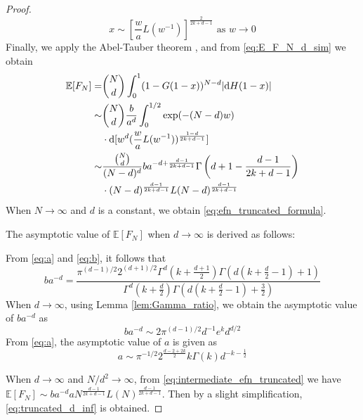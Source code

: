 \documentclass[conference,a4paper]{IEEEtran}
\def\E{\mathbb{E}}
\def\dd{\mathrm{d}}
\begin{document}
\begin{proof}
\begin{equation*}
     x \sim [\frac{w}{a} L(w^{-1})]^{\frac{2}{2k+d-1}} \textrm{ as } w \to 0
\end{equation*}
Finally, 
we apply the Abel-Tauber theorem
\cite{omey1989abelian}, and from \eqref{eq:E_F_N_d_sim} we obtain
\begin{align}
    \E[F_N] =& \binom{N}{d}\int_0^1 (1 - G(1-x))^{N-d} |\dd H(1-x)| 
    \notag \\
     \sim &\binom{N}{d} \frac{b}{a^d} \int_0^{1/2} \exp(-(N-d)w)\\
     & \cdot \dd [w^d (\frac{w}{a} L(w^{-1}))^{\frac{1-d}{2k+d-1}} ]
    \notag \\
    \sim &\frac{\binom{N}{d}}{(N-d)^d} ba^{-d+\frac{d-1}{2k+d-1}}
    \Gamma 
    \left(d+1-\frac{d-1}{2k+d-1}\right)\\
    &\cdot(N-d)^{\frac{d-1}{2k+d-1}}
    L(N-d)
    ^{\frac{d-1}{2k+d-1}}
    \label{eq:intermediate_efn_truncated}
\end{align}
When $N\to \infty$ and $d$ is a constant, we obtain \eqref{eq:efn_truncated_formula}.


The asymptotic value of $\E[F_N]$ when $d\to \infty$
is derived as follows:

From \eqref{eq:a} and \eqref{eq:b}, it follows that
\begin{equation}
     ba^{-d}
     = \frac{\pi^{(d-1)/2} 2^{(d+1)/2}
     \Gamma^d(k+\frac{d+1}{2})
     \Gamma(d(k+\frac{d}{2}-1)+1)}{\Gamma^d(k+\frac{d}{2})\Gamma(d(k+\frac{d}{2}-1)+ \frac{3}{2})}
 \end{equation}
 When $d\to \infty$, using Lemma \ref{lem:Gamma_ratio},
 we obtain the asymptotic value of $ba^{-d}$ as
 \begin{equation}
     ba^{-d} \sim 2\pi^{(d-1)/2}
     d^{-1}e^kd^{d/2}
 \end{equation}
 From \eqref{eq:a}, the asymptotic value of $a$ is given as
 \begin{equation}
     a \sim \pi^{-1/2} 2^{\frac{d-2+2k}{2}} k \Gamma(k) d^{-k-\frac{1}{2}}
 \end{equation}

When $d\to \infty$ and $N/d^2\to \infty$,
from \eqref{eq:intermediate_efn_truncated}
we have $\E[F_N] \sim ba^{-d} a N^{\frac{d-1}{2k+d-1}}
L(N)
^{\frac{d-1}{2k+d-1}}$.
Then by a slight simplification,
\eqref{eq:truncated_d_inf} is obtained.
\end{proof}
\end{document}
